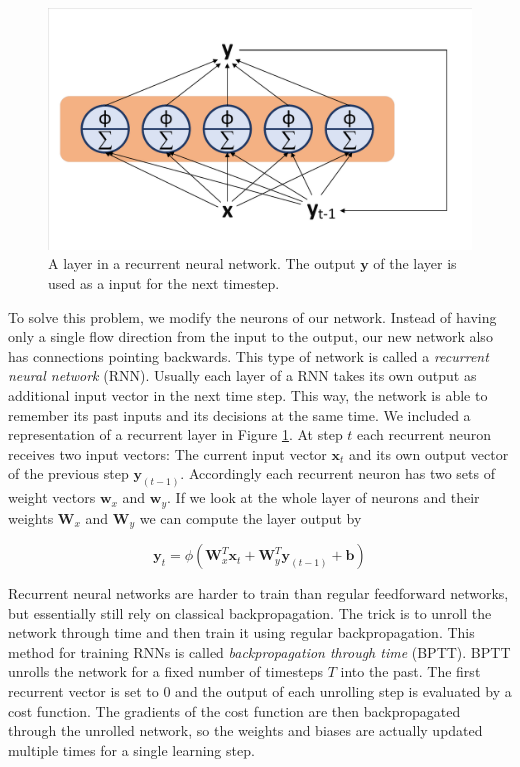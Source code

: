 \begin{figure}[ht]
    
  \begin{center}
      \includegraphics[clip, trim=10px 10px 10px 10px, width=0.7\columnwidth]{figures/deeplearning/Recurrent_Layer.pdf}
  \end{center}
  
  \caption[Recurrent Layer]{A layer in a recurrent neural network. The output $\mathbf{y}$ of the layer is used as a input for the next timestep.}
  \label{fig:RecurrentLayer}
\end{figure}

To solve this problem, we modify the neurons of our network. Instead of having only a single flow direction from the input to the output, our new network also has connections pointing backwards. This type of network is called a \textit{recurrent neural network} (RNN). Usually each layer of a RNN takes its own output as additional input vector in the next time step. This way, the network is able to remember its past inputs and its decisions at the same time. We included a representation of a recurrent layer in Figure \ref{fig:RecurrentLayer}. At step $t$ each recurrent neuron receives two input vectors: The current input vector $\mathbf{x}_t$ and its own output vector of the previous step $\mathbf{y}_{(t-1)}$. Accordingly each recurrent neuron has two sets of weight vectors $\mathbf{w}_x$ and $ \mathbf{w}_y$. If we look at the whole layer of neurons and their weights $\mathbf{W}_x$ and $\mathbf{W}_y$ we can compute the layer output by 

\[\mathbf{y}_t = \phi(\mathbf{W}_x^T \mathbf{x}_t + \mathbf{W}_y^T \mathbf{y}_{(t-1)} + \mathbf{b})\]

Recurrent neural networks are harder to train than regular feedforward networks, but essentially still rely on classical backpropagation. The trick is to unroll the network through time and then train it using regular backpropagation. This method for training RNNs is called \textit{backpropagation through time} (BPTT). BPTT unrolls the network for a fixed number of timesteps $T$ into the past. The first recurrent vector is set to 0 and the output of each unrolling step is evaluated by a cost function. The gradients of the cost function are then backpropagated through the unrolled network, so the weights and biases are actually updated multiple times for a single learning step. 

